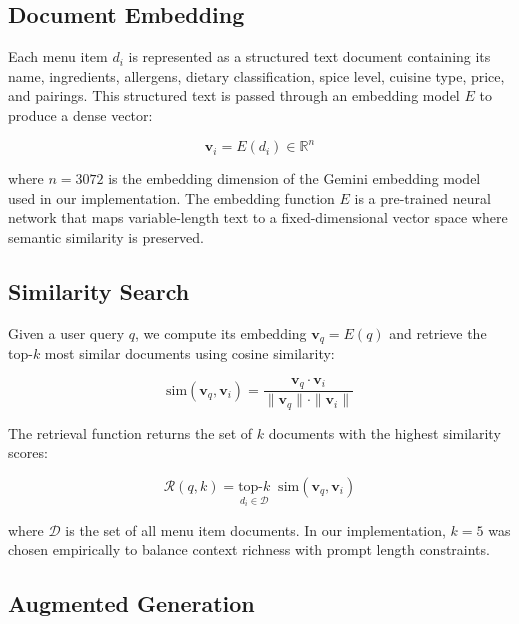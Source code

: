 \subsection{Document Embedding}

Each menu item $d_i$ is represented as a structured text document containing its name, ingredients, allergens, dietary classification, spice level, cuisine type, price, and pairings. This structured text is passed through an embedding model $E$ to produce a dense vector:

\begin{equation}\label{eq:embedding}
    \mathbf{v}_i = E(d_i) \in \mathbb{R}^{n}
\end{equation}

\noindent where $n = 3072$ is the embedding dimension of the Gemini embedding model \cite{Choi2026GeminiEmbedding2} used in our implementation. The embedding function $E$ is a pre-trained neural network that maps variable-length text to a fixed-dimensional vector space where semantic similarity is preserved.

\subsection{Similarity Search}

Given a user query $q$, we compute its embedding $\mathbf{v}_q = E(q)$ and retrieve the top-$k$ most similar documents using cosine similarity:

\begin{equation}\label{eq:cosine}
    \text{sim}(\mathbf{v}_q, \mathbf{v}_i) = \frac{\mathbf{v}_q \cdot \mathbf{v}_i}{\|\mathbf{v}_q\| \cdot \|\mathbf{v}_i\|}
\end{equation}

The retrieval function returns the set of $k$ documents with the highest similarity scores:

\begin{equation}\label{eq:topk}
    \mathcal{R}(q, k) = \underset{d_i \in \mathcal{D}}{\text{top-}k} \;\; \text{sim}(\mathbf{v}_q, \mathbf{v}_i)
\end{equation}

\noindent where $\mathcal{D}$ is the set of all menu item documents. In our implementation, $k = 5$ was chosen empirically to balance context richness with prompt length constraints.

\subsection{Augmented Generation}

